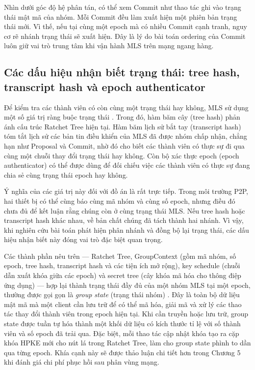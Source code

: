 \documentclass[../DoAn.tex]{subfiles}
\begin{document}
Nhìn dưới góc độ hệ phân tán, có thể xem Commit như thao tác ghi vào trạng thái mật mã của nhóm. Mỗi Commit đều làm xuất hiện một phiên bản trạng thái mới. Vì thế, nếu tại cùng một epoch mà có nhiều Commit cạnh tranh, nguy cơ rẽ nhánh trạng thái sẽ xuất hiện. Đây là lý do bài toán ordering của Commit luôn giữ vai trò trung tâm khi vận hành MLS trên mạng ngang hàng.

\subsection{Các dấu hiệu nhận biết trạng thái: tree hash, transcript hash và epoch authenticator}

Để kiểm tra các thành viên có còn cùng một trạng thái hay không, MLS sử dụng một số giá trị ràng buộc trạng thái \cite{rfc9420}. Trong đó, hàm băm cây (tree hash) phản ánh cấu trúc Ratchet Tree hiện tại. Hàm băm lịch sử bắt tay (transcript hash) tóm tắt lịch sử các bản tin điều khiển của MLS đã được nhóm chấp nhận, chẳng hạn như Proposal và Commit, nhờ đó cho biết các thành viên có thực sự đi qua cùng một chuỗi thay đổi trạng thái hay không. Còn bộ xác thực epoch (epoch authenticator) có thể được dùng để đối chiếu việc các thành viên có thực sự đang chia sẻ cùng trạng thái epoch hay không.

Ý nghĩa của các giá trị này đối với đồ án là rất trực tiếp. Trong môi trường P2P, hai thiết bị có thể cùng báo cùng mã nhóm và cùng số epoch, nhưng điều đó chưa đủ để kết luận rằng chúng còn ở cùng trạng thái MLS. Nếu tree hash hoặc transcript hash khác nhau, về bản chất chúng đã tách thành hai nhánh. Vì vậy, khi nghiên cứu bài toán phát hiện phân nhánh và đồng bộ lại trạng thái, các dấu hiệu nhận biết này đóng vai trò đặc biệt quan trọng.

Các thành phần nêu trên --- Ratchet Tree, GroupContext (gồm mã nhóm, số epoch, tree hash, transcript hash và các tiện ích mở rộng), key schedule (chuỗi dẫn xuất khóa giữa các epoch) và secret tree (cây khóa mã hóa cho thông điệp ứng dụng) --- hợp lại thành trạng thái đầy đủ của một nhóm MLS tại một epoch, thường được gọi gọn là \textit{group state} (trạng thái nhóm) \cite{rfc9420}. Đây là toàn bộ dữ liệu mật mã mà một client cần lưu trữ để có thể mã hóa, giải mã và xử lý các thao tác thay đổi thành viên trong epoch hiện tại. Khi cần truyền hoặc lưu trữ, group state được tuần tự hóa thành một khối dữ liệu có kích thước tỉ lệ với số thành viên và số epoch đã trải qua. Đặc biệt, mỗi thao tác cập nhật khóa tạo ra cặp khóa HPKE mới cho nút lá trong Ratchet Tree, làm cho group state phình to dần qua từng epoch. Khía cạnh này sẽ được thảo luận chi tiết hơn trong Chương 5 khi đánh giá chi phí phục hồi sau phân vùng mạng.
\end{document}
